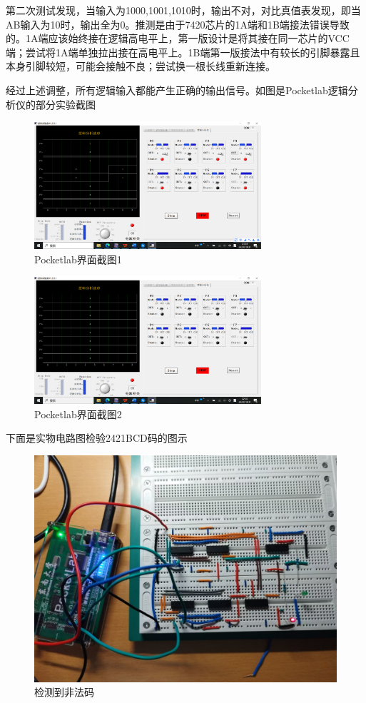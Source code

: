 \documentclass{ctexart}
\begin{document}
第二次测试发现，当输入为1000,1001,1010时，输出不对，对比真值表发现，即当AB输入为10时，输出全为0。推测是由于7420芯片的1A端和1B端接法错误导致的。1A端应该始终接在逻辑高电平上，第一版设计是将其接在同一芯片的VCC端；尝试将1A端单独拉出接在高电平上。1B端第一版接法中有较长的引脚暴露且本身引脚较短，可能会接触不良；尝试换一根长线重新连接。

经过上述调整，所有逻辑输入都能产生正确的输出信号。如图是Pocketlab逻辑分析仪的部分实验截图
\begin{figure}[H]
    \centering
    \includegraphics[width=0.75\textwidth]{fig/Pocketlab界面截图1.png}
    \caption{Pocketlab界面截图1}
    \label{Pocketlab界面截图1}
\end{figure}
\begin{figure}[H]
    \centering
    \includegraphics[width=0.75\textwidth]{fig/Pocketlab界面截图2.png}
    \caption{Pocketlab界面截图2}
    \label{Pocketlab界面截图2}
\end{figure}
下面是实物电路图检验2421BCD码的图示
\begin{figure}[H]
    \centering
    \includegraphics[width=0.6\linewidth]{fig/实物电路图3.jpg}
    \caption{检测到非法码}
    \label{检测到非法码}
\end{figure}
\end{document}
